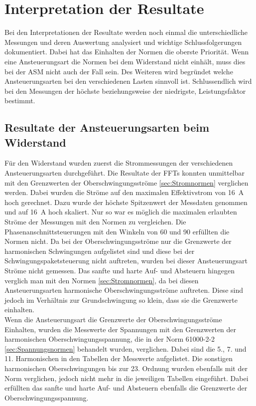 \section{Interpretation der Resultate}\label{sec:Interpretation_Resultate}
Bei den Interpretationen der Resultate werden noch einmal die unterschiedliche Messungen und deren Auswertung analysiert und wichtige Schlussfolgerungen dokumentiert. Dabei hat das Einhalten der Normen die oberste Priorität. Wenn eine Ansteuerungsart die Normen bei dem Widerstand nicht einhält, muss dies bei der ASM nicht auch der Fall sein. Des Weiteren wird begründet welche Ansteuerungsarten bei den verschiedenen Lasten sinnvoll ist. Schlussendlich wird bei den Messungen der höchste beziehungsweise der niedrigste, Leistungsfaktor bestimmt.


\subsection{Resultate der Ansteuerungsarten beim Widerstand}
Für den Widerstand wurden zuerst die Strommessungen der verschiedenen Ansteuerungsarten durchgeführt. Die Resultate der FFTs konnten unmittelbar mit den Grenzwerten der Oberschwingungsströme \ref{sec:Stromnormen} verglichen werden. Dabei wurden die Ströme auf den maximalen Effektivstrom von \SI{16}{A} hoch gerechnet. Dazu wurde der höchste Spitzenwert der Messdaten genommen und auf \SI{16}{A} hoch skaliert. Nur so war es möglich die maximalen erlaubten Ströme der Messungen mit den Normen zu vergleichen. Die Phasenanschnittsteuerungen mit den Winkeln von 60\textdegree \hspace{0.02cm} und 90\textdegree \hspace{0.02cm} erfüllten die Normen nicht. Da bei der Oberschwingungsströme nur die Grenzwerte der harmonischen Schwingungen aufgelistet sind und diese bei der Schwingungspaketsteuerung nicht auftreten, wurden bei dieser Ansteuerungsart Ströme nicht gemessen. Das sanfte und harte Auf- und Absteuern hingegen verglich man mit den Normen \ref{sec:Stromnormen}, da bei diesen Ansteuerungsarten harmonische Oberschwingungsströme auftreten. Diese sind jedoch im Verhältnis zur Grundschwingung so klein, dass sie die Grenzwerte einhalten.\\ 

Wenn die Ansteuerungsart die Grenzwerte der Oberschwingungsströme Einhalten, wurden die Messwerte der Spannungen mit den Grenzwerten der harmonischen Oberschwingungsspannung, die in der Norm 61000-2-2 \ref{sec:Spannungsnormen} behandelt wurden, verglichen. Dabei sind die 5., 7. und 11. Harmonischen in den Tabellen der Messwerte aufgelistet. Die sonstigen harmonischen Oberschwingungen bis zur 23. Ordnung wurden ebenfalls mit der Norm verglichen, jedoch nicht mehr in die jeweiligen Tabellen eingeführt. Dabei erfüllten das sanfte und harte Auf- und Absteuern ebenfalls die Grenzwerte der Oberschwingungsspannung.\\

